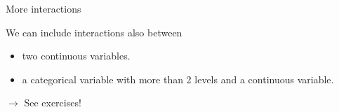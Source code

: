 \documentclass[10pt,ignorenonframetext,]{beamer}
\providecommand{\tightlist}{%
  \setlength{\itemsep}{0pt}\setlength{\parskip}{0pt}}
\begin{document}
\begin{frame}

\begin{block}{More interactions}

\vspace{4mm}

We can include interactions also between

\begin{itemize}
\tightlist
\item
  two continuous variables.
\item
  a categorical variable with more than 2 levels and a continuous
  variable.
\end{itemize}

\vspace{4mm}

\(\rightarrow\) See exercises!

\vspace{4mm}

\end{block}

\end{frame}
\end{document}
